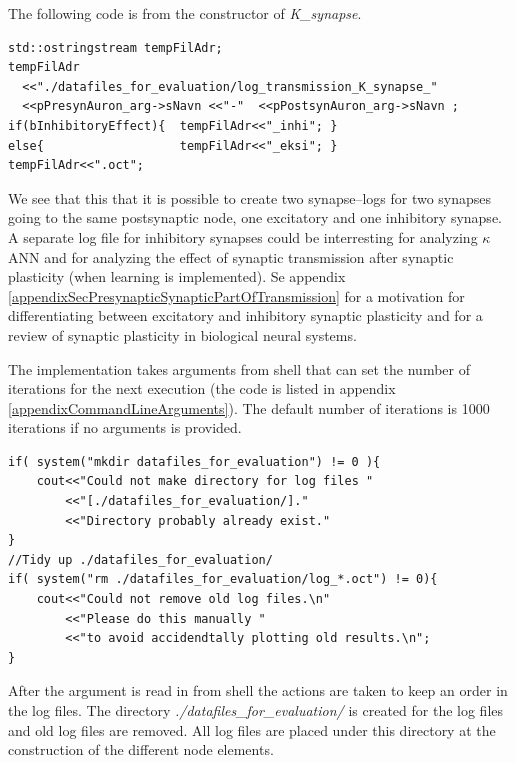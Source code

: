 The following code is from the constructor of \emph{K\_synapse}.
\begin{lstlisting}
std::ostringstream tempFilAdr;
tempFilAdr
  <<"./datafiles_for_evaluation/log_transmission_K_synapse_" 
  <<pPresynAuron_arg->sNavn <<"-"  <<pPostsynAuron_arg->sNavn ;
if(bInhibitoryEffect){ 	tempFilAdr<<"_inhi"; }
else{ 			  		tempFilAdr<<"_eksi"; }
tempFilAdr<<".oct";
\end{lstlisting}

We see that this that it is possible to create two synapse--logs for two synapses going to the same postsynaptic node, one excitatory and one inhibitory synapse.
A separate log file for inhibitory synapses could be interresting for analyzing $\kappa$ANN and for analyzing the effect of synaptic transmission after synaptic plasticity (when learning is implemented).
Se appendix \ref{appendixSecPresynapticSynapticPartOfTransmission} for a motivation for differentiating between excitatory and inhibitory synaptic plasticity and 
	for a review of synaptic plasticity in biological neural systems.


The implementation takes arguments from shell that can set the number of iterations for the next execution (the code is listed in appendix \ref{appendixCommandLineArguments}).
The default number of iterations is 1000 iterations if no arguments is provided.
\begin{lstlisting}
if( system("mkdir datafiles_for_evaluation") != 0 ){
	cout<<"Could not make directory for log files "
	    <<"[./datafiles_for_evaluation/]."
		<<"Directory probably already exist."
}
//Tidy up ./datafiles_for_evaluation/
if( system("rm ./datafiles_for_evaluation/log_*.oct") != 0){
	cout<<"Could not remove old log files.\n"
	    <<"Please do this manually "
	    <<"to avoid accidendtally plotting old results.\n";
}
\end{lstlisting}
After the argument is read in from shell the actions are taken to keep an order in the log files.
The directory \emph{./datafiles\_for\_evaluation/} is created for the log files and old log files are removed.
All log files are placed under this directory at the construction of the different node elements.

